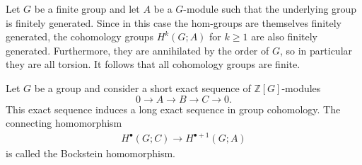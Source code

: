 	\begin{property}[Finiteness]
		Let $G$ be a finite group and let $A$ be a $G$-module such that the underlying group is finitely generated. Since in this case the hom-groups are themselves finitely generated, the cohomology groups $H^k(G;A)$ for $k\geq1$ are also finitely generated. Furthermore, they are annihilated by the order of $G$, so in particular they are all torsion. It follows that all cohomology groups are finite.
	\end{property}

    \begin{property}
        Let $G$ be a group and consider a short exact sequence of $\mathbb{Z}[G]$-modules \[0\longrightarrow A\longrightarrow B\longrightarrow C\longrightarrow0.\] This exact sequence induces a long exact sequence in group cohomology. The connecting homomorphism
        \begin{gather}
            H^\bullet(G;C)\rightarrow H^{\bullet+1}(G;A)
        \end{gather}
        is called the Bockstein homomorphism.
    \end{property}


\subsection{}

